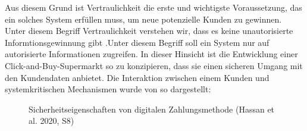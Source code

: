Aus diesem Grund ist Vertraulichkeit die erste und wichtigste Voraussetzung, das ein solches System 
erfüllen muss, um neue potenzielle Kunden zu gewinnen. Unter diesem Begriff Vertraulichkeit verstehen wir, 
dass es keine unautorisierte Informtionsgewinnung gibt \cite{refbook:SWIS} .Unter diesem Begriff soll
ein System nur auf autorisierte Informationen zugreifen. In dieser Hinsicht ist die Entwicklung 
einer Click-and-Buy-Supermarkt so zu konzipieren, dass sie einen sicheren Umgang mit den Kundendaten
anbietet. Die Interaktion zwischen einem Kunden und systemkritischen Mechanismen wurde von
\cite{refart:HARE} so dargestellt:

\vfill
\begin{figure}[htb]
    \caption{Sicherheitseigenschaften von digitalen Zahlungsmethode (Hassan et al. 2020, S8)}
    \label{fig:refark_HARE}
\end{figure}
\vfill



